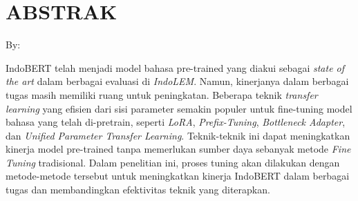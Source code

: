 \clearpage
\chapter*{ABSTRAK}

\begin{center}
    \center
    \begin{singlespace}
        \large\bfseries\MakeUppercase{\thetitle}
    
        \normalfont\normalsize
        By:
    
        \bfseries \theauthor
    \end{singlespace}
\end{center} 


\begin{singlespace}
    IndoBERT telah menjadi model bahasa pre-trained yang diakui sebagai \textit{state of the art} dalam berbagai evaluasi di \textit{IndoLEM}.
    Namun, kinerjanya dalam berbagai tugas masih memiliki ruang untuk peningkatan. 
    Beberapa teknik \textit{transfer learning} yang efisien dari sisi parameter semakin populer 
    untuk fine-tuning model bahasa yang telah di-pretrain, seperti \textit{LoRA}, \textit{Prefix-Tuning}, \textit{Bottleneck Adapter}, dan \textit{Unified Parameter Transfer Learning}. 
    Teknik-teknik ini dapat meningkatkan kinerja model pre-trained tanpa memerlukan sumber daya sebanyak metode \textit{Fine Tuning} tradisional. 
    Dalam penelitian ini, proses tuning akan dilakukan dengan metode-metode tersebut untuk meningkatkan kinerja IndoBERT dalam berbagai tugas dan membandingkan efektivitas teknik yang diterapkan.
\end{singlespace}
\clearpage

\clearpage
